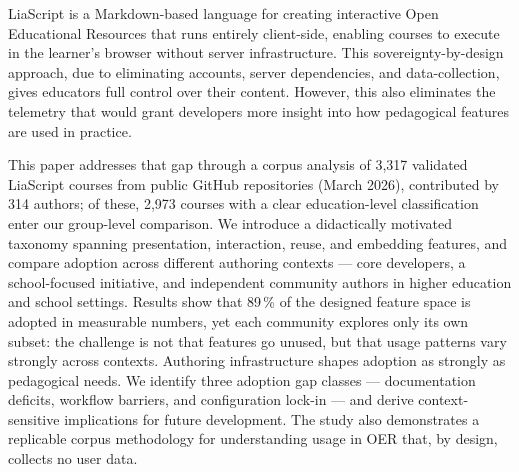 
LiaScript is a Markdown-based language for creating interactive Open Educational Resources that runs entirely client-side, enabling courses to execute in the learner’s browser without server infrastructure. This sovereignty-by-design approach, due to eliminating accounts, server dependencies, and data-collection, gives educators full control over their content. However, this also eliminates the telemetry that would grant developers more insight into how pedagogical features are used in practice.

This paper addresses that gap through a corpus analysis of 3,317 validated LiaScript courses from public GitHub repositories (March 2026), contributed by 314 authors; of these, 2,973 courses with a clear education-level classification enter our group-level comparison. We introduce a didactically motivated taxonomy spanning presentation, interaction, reuse, and embedding features, and compare adoption across different authoring contexts --- core developers, a school-focused initiative, and independent community authors in higher education and school settings. Results show that 89\,\% of the designed feature space is adopted in measurable numbers, yet each community explores only its own subset: the challenge is not that features go unused, but that usage patterns vary strongly across contexts. Authoring infrastructure shapes adoption as strongly as pedagogical needs. We identify three adoption gap classes --- documentation deficits, workflow barriers, and configuration lock-in --- and derive context-sensitive implications for future development.
The study also demonstrates a replicable corpus methodology for understanding usage in OER that, by design, collects no user data.